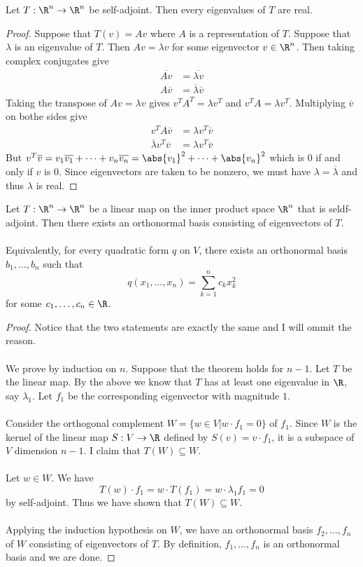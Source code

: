 \begin{prp}{}{} Let $T:\R^n\to\R^n$ be self-adjoint. Then every eigenvalues of $T$ are real. \tcbline
\begin{proof}
Suppose that $T(v)=Av$ where $A$ is a representation of $T$. Suppose that $\lambda$ is an eigenvalue of $T$. Then $Av=\lambda v$ for some eigenvector $v\in\R^n$. Then taking complex conjugates give 
\begin{align*}
\overline{Av}&=\overline{\lambda v}\\
A\overline{v}&=\overline{\lambda}\overline{v}
\end{align*}
Taking the transpose of $Av=\lambda v$ gives $v^TA^T=\lambda v^T$ and $v^TA=\lambda v^T$. Multiplying $\overline{v}$ on bothe sides give 
\begin{align*}
v^TA\overline{v}&=\lambda v^T\overline{v}\\
\overline{\lambda}v^T\overline{v}&=\lambda v^T\overline{v}
\end{align*}
But $v^T\overline{v}=v_1\overline{v_1}+\dots+v_n\overline{v_n}=\abs{v_1}^2+\dots+\abs{v_n}^2$ which is $0$ if and only if $v$ is $0$. Since eigenvectors are taken to be nonzero, we must have $\lambda=\overline{\lambda}$ and thus $\lambda$ is real. 
\end{proof}
\end{prp}

\begin{thm}{}{} Let $T:\R^n\to\R^n$ be a linear map on the inner product space $\R^n$ that is seldf-adjoint. Then there exists an orthonormal basis consisting of eigenvectors of $T$. \\~\\
Equivalently, for every quadratic form $q$ on $V$, there exists an orthonormal basis $b_1,\dots,b_n$ such that $$q(x_1,\dots,x_n)=\sum_{k=1}^nc_kx_k^2$$ for some $c_1,\dots,c_n\in\R$. \tcbline
\begin{proof}
Notice that the two statements are exactly the same and I will ommit the reason. \\~\\
We prove by induction on $n$. Suppose that the theorem holds for $n-1$. Let $T$ be the linear map. By the above we know that $T$ has at least one eigenvalue in $\R$, say $\lambda_1$. Let $f_1$ be the corresponding eigenvector with magnitude $1$. \\~\\
Consider the orthogonal complement $W=\{w\in V|w\cdot f_1=0\}$ of $f_1$. Since $W$ is the kernel of the linear map $S:V\to\R$ defined by $S(v)=v\cdot f_1$, it is a subspace of $V$ dimension $n-1$. I claim that $T(W)\subseteq W$. \\~\\
Let $w\in W$. We have $$T(w)\cdot f_1=w\cdot T(f_1)=w\cdot\lambda_1f_1=0$$ by self-adjoint. Thus we have shown that $T(W)\subseteq W$. \\~\\
Applying the induction hypothesis on $W$, we have an orthonormal basis $f_2,\dots,f_n$ of $W$ consisting of eigenvectors of $T$. By definition, $f_1,\dots,f_n$ is an orthonormal basis and we are done. 
\end{proof}
\end{thm}

